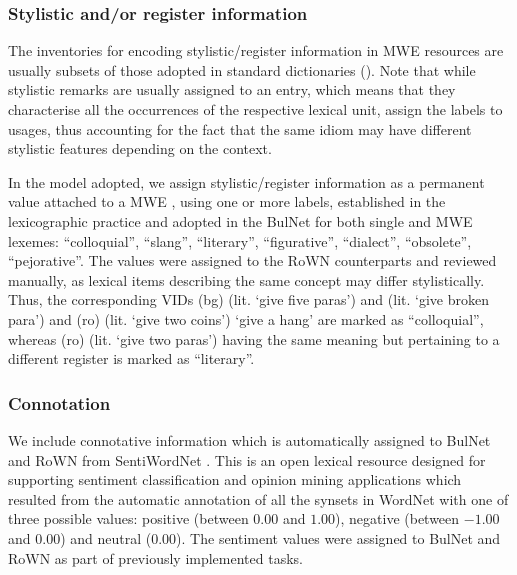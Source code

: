 \documentclass[output=paper,colorlinks,citecolor=brown]{langscibook}
\begin{document}
\subsubsection{Stylistic and/or register information}\label{stylistic}

The inventories for encoding stylistic/register information in MWE resources are usually subsets of those adopted in standard dictionaries (). 
Note that while stylistic remarks are usually assigned to an entry, which means that they characterise all the occurrences of the respective lexical unit, \citet{fellbaum2005} assign the labels to usages, thus accounting for the fact that the same idiom may have different stylistic features depending on the context.

In the model adopted, we assign stylistic/register information as a permanent value attached to a MWE%
, using one or more labels, established in the lexicographic practice and adopted in the BulNet for both single and MWE lexemes: ``colloquial'', ``slang'', ``literary'', ``figurative'', ``dialect'', ``obsolete'', ``pejorative''. The values were assigned to the RoWN counterparts and reviewed manually, as lexical items describing the same concept may differ stylistically. 
Thus, the corresponding VIDs (bg)  (lit. `give five paras') and  (lit. `give broken para') and (ro)  (lit. `give two coins')  {`give a hang'} are marked as ``colloquial'', whereas (ro)  (lit. `give two paras') having the same meaning but pertaining to a different register is marked as ``literary''.

\subsubsection{Connotation}
We include connotative information which is automatically assigned to BulNet and RoWN from SentiWordNet \citep{baccianella-et-al2010}. This is an open lexical resource designed for supporting sentiment classification and opinion mining applications which resulted from the automatic annotation of all the synsets in WordNet with one of three possible values: positive (between $0.00$ and $1.00$), negative (between $-1.00$ and $0.00$) and neutral ($0.00$). The sentiment values were assigned to BulNet and RoWN as part of previously implemented tasks.
\end{document}
